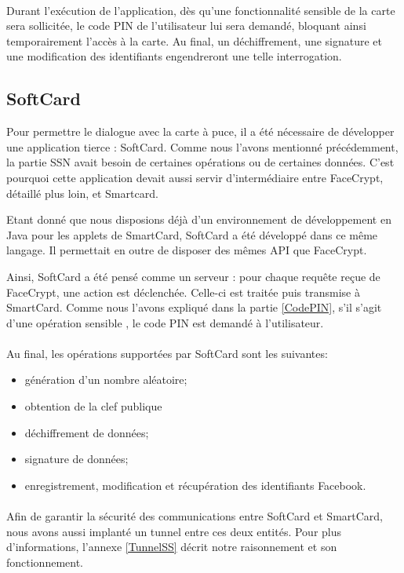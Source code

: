 \documentclass[a4paper,11pt,french]{article}
\begin{document}
\paragraph{}
Durant l'exécution de l'application, dès qu'une fonctionnalité sensible de la 
carte sera sollicitée, le code PIN de l'utilisateur lui sera demandé, bloquant 
ainsi temporairement l'accès à la carte. Au final, un déchiffrement, une signature
et une modification des identifiants engendreront une telle interrogation.

\subsection{SoftCard}
Pour permettre le dialogue avec la carte à puce, il a été nécessaire de développer
une application tierce : SoftCard. Comme nous l'avons mentionné précédemment,
la partie SSN avait besoin de certaines opérations ou de certaines données. 
C'est pourquoi cette application devait aussi servir d'intermédiaire entre 
FaceCrypt, détaillé plus loin, et Smartcard.

Etant donné que nous disposions déjà d'un environnement de développement en Java
pour les applets de SmartCard, SoftCard a été développé dans ce même langage. Il
permettait en outre de disposer des mêmes API que FaceCrypt.

Ainsi, SoftCard a été pensé comme un serveur : pour chaque requête reçue de 
FaceCrypt, une action est déclenchée. Celle-ci est traitée puis transmise à
SmartCard. Comme nous l'avons expliqué dans la partie \ref{CodePIN}, s'il s'agit
d'une opération \og sensible \fg, le code PIN est demandé à l'utilisateur.

\paragraph{}
Au final, les opérations supportées par SoftCard sont les suivantes:  
\begin{itemize}
    \item génération d'un nombre aléatoire;
    \item obtention de la clef publique
    \item déchiffrement de données;
    \item signature de données;
    \item enregistrement, modification et récupération des identifiants Facebook.
\end{itemize}

\paragraph{}
Afin de garantir la sécurité des communications entre SoftCard et SmartCard,
nous avons aussi implanté un tunnel entre ces deux entités. Pour plus 
d'informations, l'annexe \ref{TunnelSS} décrit notre raisonnement et son
fonctionnement.
\end{document}
